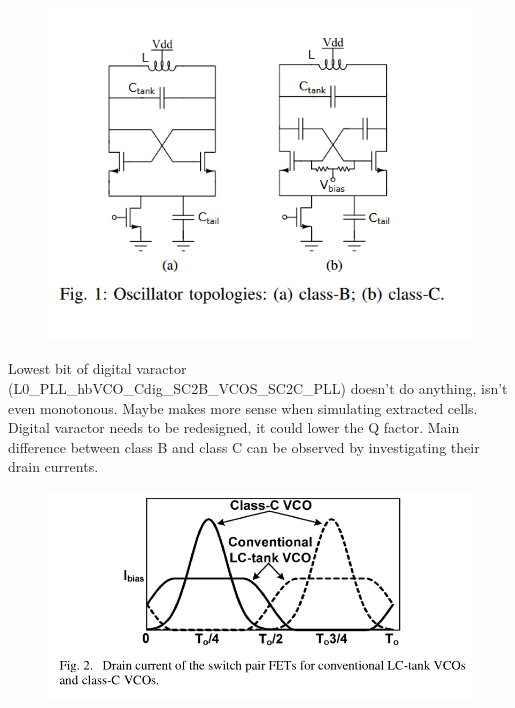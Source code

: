 \begin{figure}[ht!]
	\includegraphics[width=\linewidth]{Figures/class_C_vs_class_B.png}
	\label{fig:classC_classB}
\end{figure}

Lowest bit of digital varactor (L0\_PLL\_hbVCO\_Cdig\_SC2B\_VCOS\_SC2C\_PLL) doesn't do anything, isn't even monotonous. Maybe makes more sense when simulating extracted cells. Digital varactor needs to be redesigned, it could lower the Q factor.
Main difference between class B and class C can be observed by investigating their drain currents.

\begin{figure}[ht!]
	\includegraphics[width=\linewidth]{Figures/drainCurrent_classB_vs_classC.png}
	\label{fig:drainCurrent_classB_vs_classC}
\end{figure}

